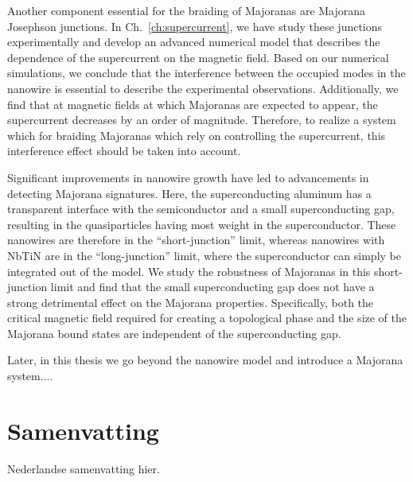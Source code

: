 Another component essential for the braiding of Majoranas are Majorana Josephson junctions.
In Ch.~\ref{ch:supercurrent}, we have study these junctions experimentally and develop an advanced numerical model that describes the dependence of the supercurrent on the magnetic field.
Based on our numerical simulations, we conclude that the interference between the occupied modes in the nanowire is essential to describe the experimental observations.
Additionally, we find that at magnetic fields at which Majoranas are expected to appear, the supercurrent decreases by an order of magnitude.
Therefore, to realize a system which for braiding Majoranas which rely on controlling the supercurrent, this interference effect should be taken into account.

Significant improvements in nanowire growth have led to advancements in detecting Majorana signatures.
Here, the superconducting aluminum has a transparent interface with the semiconductor and a small superconducting gap, resulting in the quasiparticles having most weight in the superconductor.
These nanowires are therefore in the ``short-junction'' limit, whereas nanowires with NbTiN are in the ``long-junction'' limit, where the superconductor can simply be integrated out of the model.
We study the robustness of Majoranas in this short-junction limit and find that the small superconducting gap does not have a strong detrimental effect on the Majorana properties.
Specifically, both the critical magnetic field required for creating a topological phase and the size of the Majorana bound states are independent of the superconducting gap.

Later, in this thesis we go beyond the nanowire model and introduce a Majorana system....

\chapter*{Samenvatting}
{

Nederlandse samenvatting hier.

}